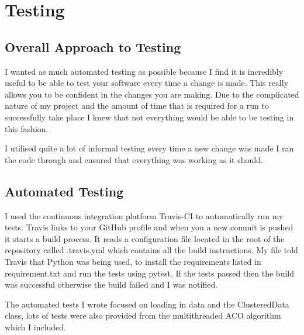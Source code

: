 \section{Testing}


\subsection{Overall Approach to Testing}

I wanted as much automated testing as possible because I find it is incredibly useful to be able to test your software every time a change is made. This really allows you to be confident in the changes you are making. Due to the complicated nature of my project and the amount of time that is required for a run to successfully take place I knew that not everything would be able to be testing in this fashion.

I utilised quite a lot of informal testing every time a new change was made I ran the code through and ensured that everything was working as it should.

\subsection{Automated Testing}

I used the continuous integration platform Travis-CI\cite{travis_ci} to automatically run my tests. Travis links to your GitHub profile and when you a new commit is pushed it starts a build process. It reads a configuration file located in the root of the repository called .travis.yml which contains all the build instructions. My file told Travis that Python was being used, to install the requirements listed in requirement.txt and run the tests using pytest. If the tests passed then the build was successful otherwise the build failed and I was notified. 

The automated tests I wrote focused on loading in data and the ClusteredData class, lots of tests were also provided from the multithreaded ACO algorithm which I included.


